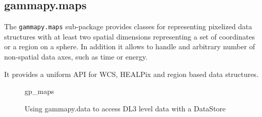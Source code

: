 \subsection{gammapy.maps}
\label{ssec:gammapy-maps}
The \verb|gammapy.maps| sub-package provides classes for representing pixelized
data structures with at least two spatial dimensions representing a set of
coordinates or a region on a sphere. In addition it allows to handle and
arbitrary number of non-spatial data axes, such as time or energy.

It provides a uniform API for WCS, HEALPix and region based data structures.

\begin{figure}
	{gp_maps}
	\caption{Using gammapy.data to access DL3 level data with a DataStore}
	\label{codeexample:data}
\end{figure}
